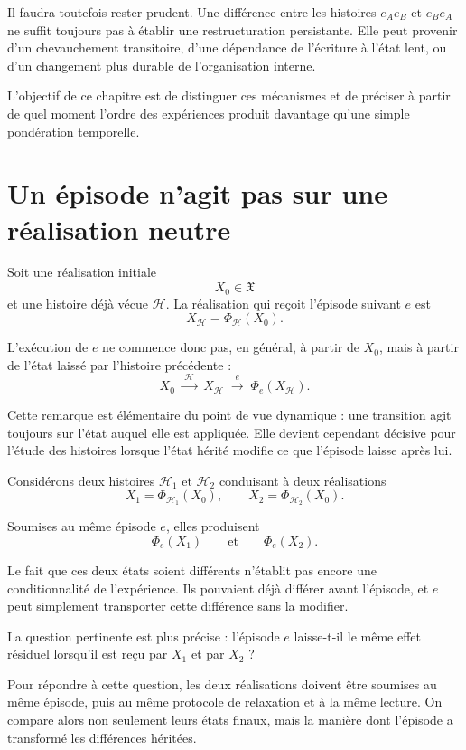 Il faudra toutefois rester prudent. Une différence entre les histoires 
\(
e_Ae_B
\text{ et }
e_Be_A
\)
ne suffit toujours pas à établir une restructuration persistante. Elle peut provenir d'un chevauchement transitoire, d'une dépendance de l'écriture à l'état lent, ou d'un changement plus durable de l'organisation interne.

L'objectif de ce chapitre est de distinguer ces mécanismes et de préciser à partir de quel moment l'ordre des expériences produit davantage qu'une simple pondération temporelle.

\section{Un épisode n'agit pas sur une réalisation neutre}
\label{t3-episode-realisation-heritee}

Soit une réalisation initiale
\[
X_0\in\mathfrak X
\]
et une histoire déjà vécue $\mathcal H$. La réalisation qui reçoit l'épisode suivant $e$ est
\[
X_{\mathcal H}
=
\Phi_{\mathcal H}(X_0).
\]

L'exécution de $e$ ne commence donc pas, en général, à partir de $X_0$, mais à partir de l'état laissé par l'histoire précédente :
\[
X_0
\;\xrightarrow{\;\mathcal H\;}\;
X_{\mathcal H}
\;\xrightarrow{\;e\;}\;
\Phi_e(X_{\mathcal H}).
\]

Cette remarque est élémentaire du point de vue dynamique : une transition agit toujours sur l'état auquel elle est appliquée. Elle devient cependant décisive pour l'étude des histoires lorsque l'état hérité modifie ce que l'épisode laisse après lui.

Considérons deux histoires $\mathcal H_1$ et $\mathcal H_2$ conduisant à deux réalisations
\[
X_1=\Phi_{\mathcal H_1}(X_0),
\qquad
X_2=\Phi_{\mathcal H_2}(X_0).
\]

Soumises au même épisode $e$, elles produisent
\[
\Phi_e(X_1)
\qquad\text{et}\qquad
\Phi_e(X_2).
\]

Le fait que ces deux états soient différents n'établit pas encore une conditionnalité de l'expérience. Ils pouvaient déjà différer avant l'épisode, et $e$ peut simplement transporter cette différence sans la modifier.

La question pertinente est plus précise : l'épisode $e$ laisse-t-il le même effet résiduel lorsqu'il est reçu par $X_1$ et par $X_2$ ?

Pour répondre à cette question, les deux réalisations doivent être soumises au même épisode, puis au même protocole de relaxation et à la même lecture. On compare alors non seulement leurs états finaux, mais la manière dont l'épisode a transformé les différences héritées.

